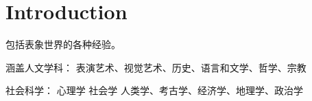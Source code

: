 


\chapter{Introduction}

包括表象世界的各种经验。

涵盖人文学科：
表演艺术、视觉艺术、历史、语言和文学、哲学、宗教



社会科学：
心理学
社会学
人类学、考古学、经济学、地理学、政治学



